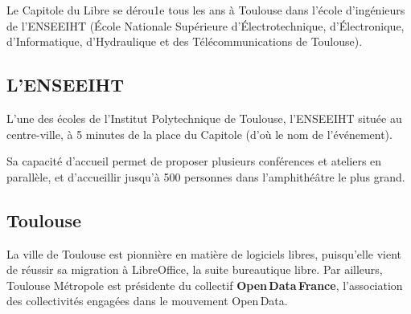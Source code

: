 
Le Capitole du Libre se dérou1e tous les ans à Toulouse dans l'école d'ingénieurs de l'ENSEEIHT (École Nationale Supérieure d'Électrotechnique, d'Électronique, d'Informatique, d'Hydraulique  et des Télécommunications de Toulouse). 

\subsection{L'ENSEEIHT}

L'une des écoles de l'Institut Polytechnique de Toulouse, l'ENSEEIHT située au centre-ville, à 5 minutes de la place du Capitole (d'où le nom de l'événement).

Sa capacité d'accueil permet de proposer plusieurs conférences et ateliers en parallèle, et d'accueillir jusqu'à 500 personnes dans l'amphithéâtre le plus grand.

\subsection{Toulouse}

La ville de Toulouse est pionnière en matière de logiciels libres, puisqu'elle vient de réussir sa migration à LibreOffice, la suite bureautique libre. Par ailleurs, Toulouse Métropole est présidente du collectif \textbf{Open\,Data\,France}, l'association des collectivités engagées dans le mouvement Open\,Data.


